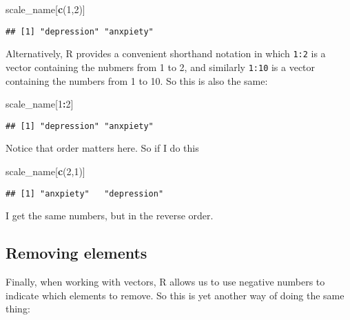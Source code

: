 \documentclass[]{book}
\newenvironment{Shaded}{\begin{snugshade}}{\end{snugshade}}
\newcommand{\DecValTok}[1]{\textcolor[rgb]{0.00,0.00,0.81}{#1}}
\newcommand{\KeywordTok}[1]{\textcolor[rgb]{0.13,0.29,0.53}{\textbf{#1}}}
\newcommand{\NormalTok}[1]{#1}
\newcommand{\OperatorTok}[1]{\textcolor[rgb]{0.81,0.36,0.00}{\textbf{#1}}}
\begin{document}
\begin{Shaded}
\begin{Highlighting}[]
\NormalTok{scale_name[}\KeywordTok{c}\NormalTok{(}\DecValTok{1}\NormalTok{,}\DecValTok{2}\NormalTok{)]}
\end{Highlighting}
\end{Shaded}

\begin{verbatim}
## [1] "depression" "anxpiety"
\end{verbatim}

Alternatively, R provides a convenient shorthand notation in which \texttt{1:2} is a vector containing the nubmers from 1 to 2, and similarly \texttt{1:10} is a vector containing the numbers from 1 to 10. So this is also the same:

\begin{Shaded}
\begin{Highlighting}[]
\NormalTok{scale_name[}\DecValTok{1}\OperatorTok{:}\DecValTok{2}\NormalTok{]}
\end{Highlighting}
\end{Shaded}

\begin{verbatim}
## [1] "depression" "anxpiety"
\end{verbatim}

Notice that order matters here. So if I do this

\begin{Shaded}
\begin{Highlighting}[]
\NormalTok{scale_name[}\KeywordTok{c}\NormalTok{(}\DecValTok{2}\NormalTok{,}\DecValTok{1}\NormalTok{)]}
\end{Highlighting}
\end{Shaded}

\begin{verbatim}
## [1] "anxpiety"   "depression"
\end{verbatim}

I get the same numbers, but in the reverse order.

\hypertarget{removing-elements}{%
\subsection{Removing elements}\label{removing-elements}}

Finally, when working with vectors, R allows us to use negative numbers to indicate which elements to remove. So this is yet another way of doing the same thing:
\end{document}
